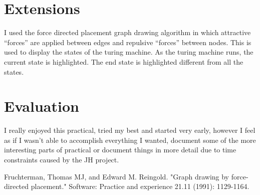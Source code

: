 \documentclass{article}
\begin{document}
\section{Extensions}

I used the force directed placement graph drawing algorithm \cite{forcedirected} in which attractive ``forces'' are applied between edges and repulsive ``forces'' between nodes. This is used to display the states of the turing machine. As the turing machine runs, the current state is highlighted. The end state is highlighted different from all the states.

\section{Evaluation}

I really enjoyed this practical, tried my best and started very early, however I feel as if I wasn't able to accomplish everything I wanted, document some of the more interesting parts of practical or document things in more detail due to time constraints caused by the JH project. 

\begin{thebibliography}{1}
  
Fruchterman, Thomas MJ, and Edward M. Reingold. "Graph drawing by force‐directed placement." Software: Practice and experience 21.11 (1991): 1129-1164.

\end{thebibliography}
\end{document}

